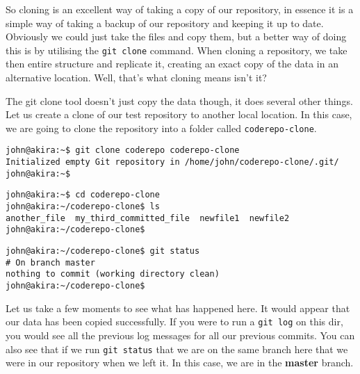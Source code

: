 So cloning is an excellent way of taking a copy of our repository, in essence it is a simple way of taking a backup of our repository and keeping it up to date.  Obviously we could just take the files and copy them, but a better way of doing this is by utilising the \texttt{git clone} command.  When cloning a repository, we take then entire structure and replicate it, creating an exact copy of the data in an alternative location.  Well, that's what cloning means isn't it?

The git clone tool doesn't just copy the data though, it does several other things.  Let us create a clone of our test repository to another local location.  In this case, we are going to clone the repository into a folder called \texttt{coderepo-clone}.

\begin{Verbatim}[frame=leftline,framerule=1mm,fontsize=\relsize{-3}] 
john@akira:~$ git clone coderepo coderepo-clone
Initialized empty Git repository in /home/john/coderepo-clone/.git/
john@akira:~$ 
\end{Verbatim}

\begin{Verbatim}[frame=leftline,framerule=1mm,fontsize=\relsize{-3}] 
john@akira:~$ cd coderepo-clone
john@akira:~/coderepo-clone$ ls
another_file  my_third_committed_file  newfile1  newfile2
john@akira:~/coderepo-clone$
\end{Verbatim}

\begin{Verbatim}[frame=leftline,framerule=1mm,fontsize=\relsize{-3}] 
john@akira:~/coderepo-clone$ git status
# On branch master
nothing to commit (working directory clean)
john@akira:~/coderepo-clone$ 
\end{Verbatim}

Let us take a few moments to see what has happened here.  It would appear that our data has been copied successfully.  If you were to run a \texttt{git log} on this dir, you would see all the previous log messages for all our previous commits.  You can also see that if we run \texttt{git status} that we are on the same branch here that we were in our repository when we left it.  In this case, we are in the \textbf{master} branch.

